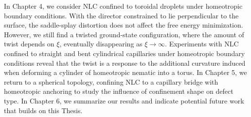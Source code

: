 In Chapter 4, we consider NLC confined to toroidal droplets under homeotropic boundary conditions.
With the director constrained to lie perpendicular to the surface, the saddle-splay distortion does not affect the free energy minimization.
However, we still find a twisted ground-state configuration, where the amount of twist depends on $\xi$, eventually disappearing as $\xi \rightarrow \infty$.
Experiments with NLC confined to straight and bent cylindrical capillaries under homeotropic boundary conditions reveal that the twist is a response to the additional curvature induced when deforming a cylinder of homeotropic nematic into a torus.
In Chapter 5, we return to a spherical topology, confining NLC to a capillary bridge with homeotropic anchoring to study the influence of confinement shape on defect type.
In Chapter 6, we summarize our results and indicate potential future work that builds on this Thesis.
